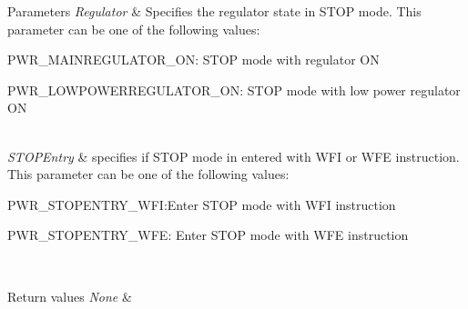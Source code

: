 \begin{DoxyParams}{Parameters}
{\em Regulator} & Specifies the regulator state in S\+T\+OP mode. This parameter can be one of the following values\+: \begin{DoxyItemize}
\item P\+W\+R\+\_\+\+M\+A\+I\+N\+R\+E\+G\+U\+L\+A\+T\+O\+R\+\_\+\+ON\+: S\+T\+OP mode with regulator ON \item P\+W\+R\+\_\+\+L\+O\+W\+P\+O\+W\+E\+R\+R\+E\+G\+U\+L\+A\+T\+O\+R\+\_\+\+ON\+: S\+T\+OP mode with low power regulator ON \end{DoxyItemize}
\\
\hline
{\em S\+T\+O\+P\+Entry} & specifies if S\+T\+OP mode in entered with W\+FI or W\+FE instruction. This parameter can be one of the following values\+: \begin{DoxyItemize}
\item P\+W\+R\+\_\+\+S\+T\+O\+P\+E\+N\+T\+R\+Y\+\_\+\+W\+FI\+:Enter S\+T\+OP mode with W\+FI instruction \item P\+W\+R\+\_\+\+S\+T\+O\+P\+E\+N\+T\+R\+Y\+\_\+\+W\+FE\+: Enter S\+T\+OP mode with W\+FE instruction \end{DoxyItemize}
\\
\hline
\end{DoxyParams}

\begin{DoxyRetVals}{Return values}
{\em None} & \\
\hline
\end{DoxyRetVals}
